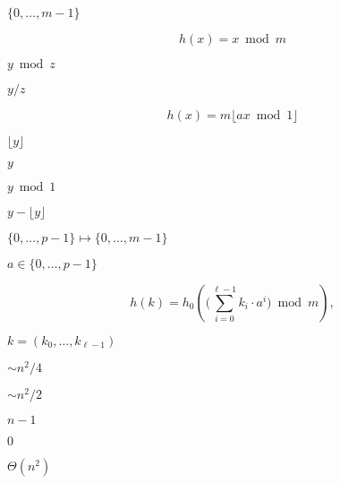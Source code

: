 \documentclass{article}
\begin{document}
$\{0,\ldots,m-1\}$
\pagebreak

\[
  h(x) = x \bmod m
\]
\pagebreak

$y \bmod z$
\pagebreak

$y / z$
\pagebreak

\[
  h(x) = m \lfloor a x \bmod 1 \rfloor
\]
\pagebreak

$\lfloor y \rfloor$
\pagebreak

$y$
\pagebreak

$y \bmod 1$
\pagebreak

$y - \lfloor y \rfloor$
\pagebreak

$\{0,\ldots,p-1\} \mapsto \{0,\ldots,m-1\}$
\pagebreak

$a \in \{0,\ldots,p-1\}$
\pagebreak

\[
    h(k) = h_0 \left( \big(\sum_{i=0}^{\ell-1} k_i\cdot a^i \big) \bmod m \right),
\]
\pagebreak

$k=(k_0,\ldots,k_{\ell-1})$
\pagebreak

$\sim n^2/4$
\pagebreak

$\sim n^2/2$
\pagebreak

$n-1$
\pagebreak

$0$
\pagebreak

$\Theta(n^2)$
\pagebreak
\end{document}
